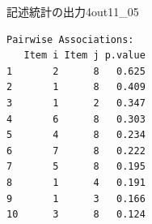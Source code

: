 \begin{Rscreen}{記述統計の出力4}{out11_05}
	\begin{verbatim}
Pairwise Associations:
   Item i Item j p.value
1       2      8   0.625
2       1      8   0.409
3       1      2   0.347
4       6      8   0.303
5       4      8   0.234
6       7      8   0.222
7       5      8   0.195
8       1      4   0.191
9       1      3   0.166
10      3      8   0.124
    \end{verbatim}
\end{Rscreen}
